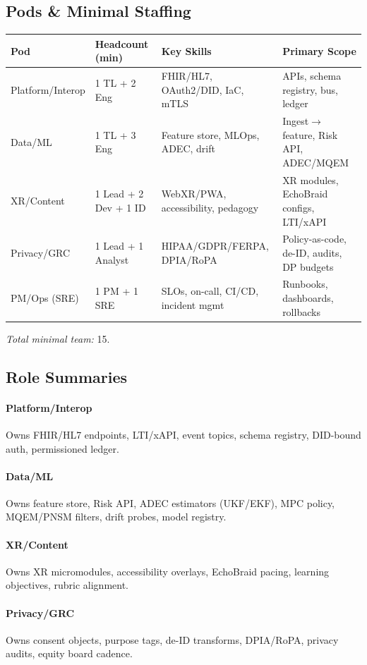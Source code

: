 \documentclass[11pt]{article}
\theoremstyle{plain}
\begin{document}
\subsection{Pods \& Minimal Staffing}
\begin{center}
\begin{tabular}{l l l l}
\hline
\textbf{Pod} & \textbf{Headcount (min)} & \textbf{Key Skills} & \textbf{Primary Scope} \\
\hline
Platform/Interop & 1 TL + 2 Eng & FHIR/HL7, OAuth2/DID, IaC, mTLS & APIs, schema registry, bus, ledger \\
Data/ML & 1 TL + 3 Eng & Feature store, MLOps, ADEC, drift & Ingest$\rightarrow$feature, Risk API, ADEC/MQEM \\
XR/Content & 1 Lead + 2 Dev + 1 ID & WebXR/PWA, accessibility, pedagogy & XR modules, EchoBraid configs, LTI/xAPI \\
Privacy/GRC & 1 Lead + 1 Analyst & HIPAA/GDPR/FERPA, DPIA/RoPA & Policy-as-code, de-ID, audits, DP budgets \\
PM/Ops (SRE) & 1 PM + 1 SRE & SLOs, on-call, CI/CD, incident mgmt & Runbooks, dashboards, rollbacks \\
\hline
\end{tabular}
\end{center}
\textit{Total minimal team:} 15.

\subsection{Role Summaries}
\paragraph{Platform/Interop} Owns FHIR/HL7 endpoints, LTI/xAPI, event topics, schema registry, DID-bound auth, permissioned ledger.
\paragraph{Data/ML} Owns feature store, Risk API, ADEC estimators (UKF/EKF), MPC policy, MQEM/PNSM filters, drift probes, model registry.
\paragraph{XR/Content} Owns XR micromodules, accessibility overlays, EchoBraid pacing, learning objectives, rubric alignment.
\paragraph{Privacy/GRC} Owns consent objects, purpose tags, de-ID transforms, DPIA/RoPA, privacy audits, equity board cadence.
\end{document}
